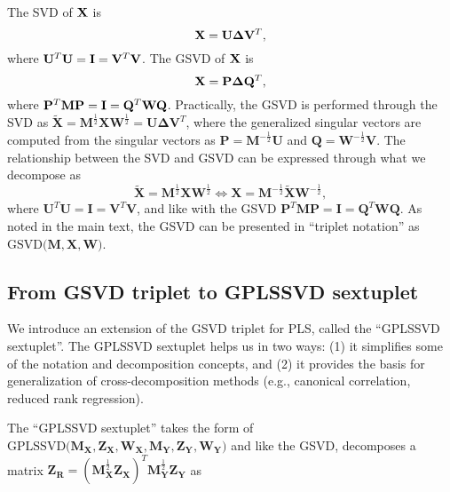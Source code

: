 \documentclass[12pt]{article}
\begin{document}
The SVD of \({\bf X}\) is \begin{equation}
{\bf X} = {\bf U}{\boldsymbol \Delta}{\bf V}^{T},
\end{equation} where
\({\bf U}^{T}{\bf U} = {\bf I} = {\bf V}^{T}{\bf V}\). The GSVD of
\({\bf X}\) is \begin{equation}
{\bf X} = {\bf P}{\boldsymbol \Delta}{\bf Q}^{T},
\end{equation} where
\({\bf P}^{T}{\bf M}{\bf P} = {\bf I} = {\bf Q}^{T}{\bf W}{\bf Q}\).
Practically, the GSVD is performed through the SVD as
\(\widetilde{\mathbf X} = {\mathbf M}^{\frac{1}{2}}{\mathbf X}{\mathbf W}^{\frac{1}{2}} = {\mathbf U} {\boldsymbol \Delta} {\mathbf V}^{T}\),
where the generalized singular vectors are computed from the singular
vectors as \({\mathbf P} = {\mathbf M}^{-\frac{1}{2}}{\mathbf U}\) and
\({\mathbf Q} = {\mathbf W}^{-\frac{1}{2}}{\mathbf V}\). The
relationship between the SVD and GSVD can be expressed through what we
decompose as \begin{equation}
\widetilde{\mathbf X} = {\mathbf M}^{\frac{1}{2}}{\mathbf X}{\mathbf W}^{\frac{1}{2}} \Longleftrightarrow {\mathbf X} = {\mathbf M}^{-\frac{1}{2}}\widetilde{\mathbf X}{\mathbf W}^{-\frac{1}{2}},
\end{equation} where
\({\mathbf U}^{T}{\mathbf U} = {\mathbf I} = {\mathbf V}^{T}{\mathbf V}\),
and like with the GSVD
\({\mathbf P}^{T}{\mathbf M}{\mathbf P} = {\mathbf I} = {\mathbf Q}^{T}{\mathbf W}{\mathbf Q}\).
As noted in the main text, the GSVD can be presented in ``triplet
notation'' as
\(\mathrm{GSVD(}{\mathbf M}, {\mathbf X}, {\mathbf W}\mathrm{)}\).

\hypertarget{from-gsvd-triplet-to-gplssvd-sextuplet}{%
\subsection{From GSVD triplet to GPLSSVD
sextuplet}\label{from-gsvd-triplet-to-gplssvd-sextuplet}}

We introduce an extension of the GSVD triplet for PLS, called the
``GPLSSVD sextuplet''. The GPLSSVD sextuplet helps us in two ways: (1)
it simplifies some of the notation and decomposition concepts, and (2)
it provides the basis for generalization of cross-decomposition methods
(e.g., canonical correlation, reduced rank regression).

The ``GPLSSVD sextuplet'' takes the form of
\(\mathrm{GPLSSVD(} {\mathbf M}_{\mathbf X}, {\mathbf Z}_{\mathbf X}, {\mathbf W}_{\mathbf X}, {\mathbf M}_{\mathbf Y}, {\mathbf Z}_{\mathbf Y}, {\mathbf W}_{\mathbf Y} \mathrm{)}\)
and like the GSVD, decomposes a matrix
\({\mathbf Z}_{\mathbf R} = ({\mathbf M}_{\mathbf X}^{\frac{1}{2}}{\mathbf Z}_{\mathbf X})^{T} {\mathbf M}_{\mathbf Y}^{\frac{1}{2}} {\mathbf Z}_{\mathbf Y}\)
as
\end{document}
